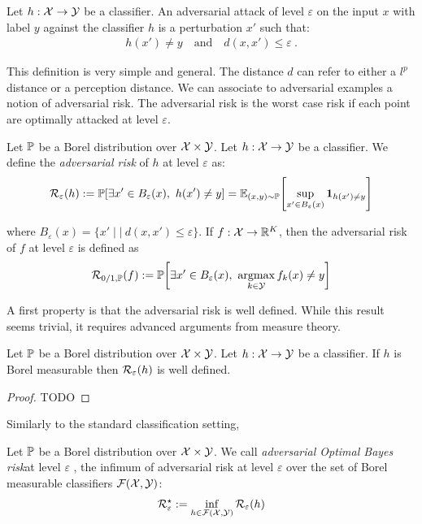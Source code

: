 \begin{definition} 
    Let $h:\mathcal{X}\to\mathcal{Y}$ be a classifier. An adversarial attack of level $\varepsilon$ on the input $x$ with label $y$ against the classifier $h$ is a perturbation $x'$ such that:
    \begin{align*}
        h(x')\neq y\quad\text{and}\quad d(x,x')\leq\varepsilon~.
    \end{align*}
\end{definition}
This definition is very simple and general. The distance $d$ can refer to either a $l^p$ distance or a perception distance. We can associate to adversarial examples a notion of adversarial risk. The adversarial risk is the worst case risk if each point are optimally attacked at level $\varepsilon$.
\begin{definition}
  Let $\mathbb{P}$ be a Borel distribution over $\mathcal{X} \times \mathcal{Y}$. Let $h:\mathcal{X}\to\mathcal{Y}$ be a classifier. We define the \emph{adversarial risk} of $h$ at level $\varepsilon$ as:
  \begin{align*}
    \risk_\varepsilon(h):=\PP\left[\exists x'\in B_\varepsilon(x),~h(x')\neq y\right] = \mathbb{E}_{(x,y)\sim\PP}\left[\sup_{x'\in B_\varepsilon(x)}\mathbf{1}_{h(x')\neq y}\right]
  \end{align*}

  where $B_\varepsilon(x) = \{x'\mid|~d(x,x')\leq\varepsilon\}$. If $f:\mathcal{X}\to\mathbb{R}^K$, then the adversarial risk of $f$ at level $\varepsilon$ is defined as
   \begin{align*}
    \risk_{0/1,\PP}(f):=\PP\left[\exists x'\in B_\varepsilon(x),~\argmaxB_{k\in\YY}f_k(x)\neq y\right]
   \end{align*}
\end{definition}
A first property is that the adversarial risk is well defined. While this result seems trivial, it requires advanced arguments from measure theory. 
\begin{prop}
  Let $\mathbb{P}$ be a Borel distribution over $\mathcal{X} \times \mathcal{Y}$. Let $h:\mathcal{X}\to\mathcal{Y}$ be a classifier. If $h$ is Borel measurable then $\mathcal{R}_\varepsilon(h)$ is well defined.
\end{prop}
\begin{proof}
  TODO
\end{proof}

Similarly to the standard classification setting, 

\begin{definition}
  Let $\mathbb{P}$ be a Borel distribution over $\mathcal{X} \times \mathcal{Y}$. We call \emph{adversarial Optimal Bayes risk}at level $\varepsilon$ , the infimum of adversarial risk at level $\varepsilon$  over the set of Borel measurable classifiers $\mathcal{F}(\mathcal{X},\mathcal{Y})$:
\begin{align*}
  \mathcal{R}^\star_\varepsilon:=\inf_{h\in\mathcal{F}(\mathcal{X},\mathcal{Y})} \mathcal{R}_\varepsilon(h)
\end{align*}

\end{definition}


